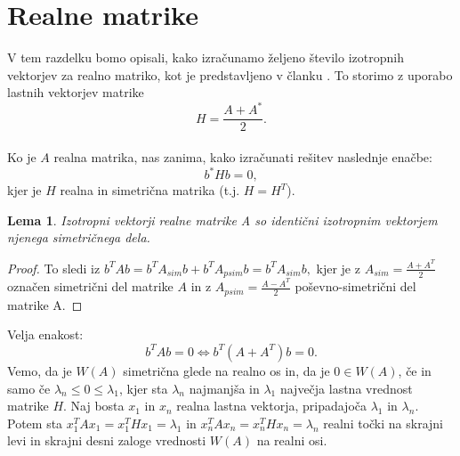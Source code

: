 \documentclass[12pt,a4paper]{amsart}
\theoremstyle{definition}
\theoremstyle{plain}
\newtheorem{lema}[definicija]{Lema}
\begin{document}
\section{Realne matrike}\label{Realne matrike}
V tem razdelku bomo opisali, kako izračunamo željeno število izotropnih vektorjev za realno matriko, kot je predstavljeno v članku \cite{meurant}. To storimo z uporabo lastnih vektorjev matrike $$H=\frac{A+A^\ast}{2}.$$\\
Ko je $A$ realna matrika, nas zanima, kako izračunati rešitev naslednje enačbe:
\begin{equation}\label{eq:realna}
b^\ast Hb=0,
\end{equation}
kjer je $H$ realna in simetrična matrika (t.j. $H=H^T$).
\begin{lema} \cite{lipkin}
Izotropni vektorji realne matrike A so identični izotropnim vektorjem njenega simetričnega dela.
\end{lema} 
\begin{proof}
To sledi iz $b^T Ab=b^T A_{sim} b +b^T A_{psim} b=b^T A_{sim} b,$ kjer je z $A_{sim}=\frac{A+A^T}{2}$ označen simetrični del matrike $A$ in z $A_{psim}=\frac{A-A^T}{2}$ poševno-simetrični del matrike A.
\end{proof}
Velja enakost:
$$b^T Ab=0 \Leftrightarrow b^T (A+A^T)b=0.$$  
Vemo, da je $W(A)$ simetrična glede na realno os in, da je $0 \in W(A)$, če in samo če $\lambda_n\le0\le\lambda_1$, kjer sta $\lambda_n$ najmanjša in $\lambda_1$ največja lastna vrednost matrike $H$. Naj bosta $x_1$ in $x_n$ realna lastna vektorja, pripadajoča $\lambda_1$ in $\lambda_n$.  Potem sta $x_1^T Ax_1=x_1^T Hx_1=\lambda_1$ in $x_n^T Ax_n=x_n^T Hx_n=\lambda_n$ realni točki na skrajni levi in skrajni desni zaloge vrednosti $W(A)$ na realni osi.\\
\end{document}
